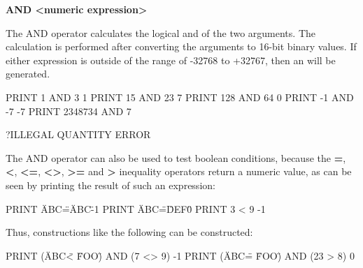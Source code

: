 {\bf <numeric expression> AND <numeric expression>}

The AND operator calculates the logical and of the two arguments.
The calculation is performed after converting the arguments to 16-bit binary values.
If either expression is outside of the range of -32768 to +32767, then an  will be generated.

\begin{screenoutput}
  PRINT 1 AND 3
  1
  PRINT 15 AND 23
  7
  PRINT 128 AND 64
  0
  PRINT -1 AND -7
  -7
  PRINT 2348734 AND 7

  ?ILLEGAL QUANTITY ERROR
\end{screenoutput}

The AND operator can also be used to test boolean conditions, because the {\bf =}, {\bf <}, {\bf <=}, {\bf <>}, {\bf >=} and {\bf >} inequality operators return a numeric value, as can be seen by printing the result of such an expression:

\begin{screenoutput}
  PRINT \"ABC\"=\"ABC\"
  -1
  PRINT \"ABC\"=\"DEF\"
  0
  PRINT 3 < 9
  -1
\end{screenoutput}

Thus, constructions like the following can be constructed:

\begin{screenoutput}
  PRINT (\"ABC\" < \"FOO\") AND (7 <> 9)
  -1
  PRINT (\"ABC\" = \"FOO\") AND (23 > 8)
  0
\end{screenoutput}
